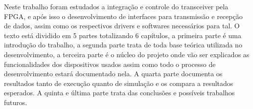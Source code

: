\documentclass{ufpatcc}
\begin{document}
\begin{ufpaResumo}
Neste trabalho foram estudados a integra\c{c}\~{a}o e controle do transceiver
pela FPGA, e ap\'{o}s isso o desenvolvimento de interfaces para transmiss\~{a}o
e recep\c{c}\~{a}o de dados, assim como os respectivos drivers e softwares
necess\'{a}rios para tal. O texto est\'{a} dividido em 5 partes totalizando 6
cap\'{i}tulos, a primeira parte \'{e} uma introdu\c{c}\~{a}o do trabalho, a
segunda parte trata de toda base te\'{o}rica utilizada no desenvolvimento, a
terceira parte \'{e} o núcleo do projeto onde v\~{a}o ser explicados as
funcionalidades dos dispositivos usados assim como todo o processo de
desenvolvimento estar\'{a} documentado nela. A quarta parte documenta os
resultados tanto de execu\c{c}\~{a}o quanto de simula\c{c}\~{a}o e os compara a
resultados esperados. A quinta e última parte trata das conclus\~{o}es e
poss\'{i}veis trabalhos futuros.

\end{ufpaResumo}
\end{document}
